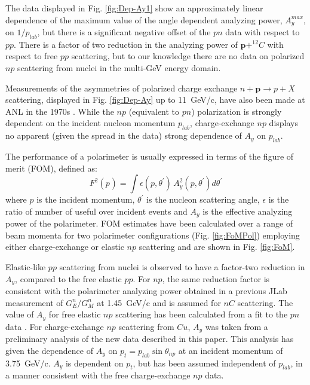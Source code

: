 \documentclass[twocolumn,epjc3]{svjour3}
\renewcommand{\vec}[1]{\boldsymbol{#1}} %
\begin{document}
The data displayed in Fig. \ref{fig:Dep-Ay1} show an approximately linear dependence of the maximum value of the angle dependent analyzing power, $A_{y}^{max}$, on $1/p_{lab}$, but there is a significant negative offset of the $pn$ data with respect to $pp$. There is a factor of two reduction in the analyzing power of $\vec{p}+^{12}\!C$ with respect to free $pp$ scattering, but to our knowledge there are no data on polarized $np$ scattering from nuclei in the multi-GeV energy domain.

Measurements of the asymmetries of polarized charge exchange $n+\vec{p}\to p+X$ scattering, displayed in Fig. \ref{fig:Dep-Ay} up to 11~GeV/c, have also been made at ANL in the 1970s \cite{Robrish:1970jw,PhysRevLett.30.1183}.  While the $np$ (equivalent to $pn$) polarization is strongly dependent on the incident nucleon momentum $p_{lab}$, charge-exchange $np$ displays no apparent (given the spread in the data) strong dependence of $A_{y}$ on $p_{lab}$.

The performance of a polarimeter is usually expressed in terms of the figure of merit (FOM), defined as:
\begin{equation}
  F^{2}(p_{})=\int\epsilon(p,\theta^{'})\,A_{y}^{2}(p,\theta^{'})d\theta^{'}
  \label{eq:FOM}
\end{equation}
where $p$ is the incident momentum, $\theta^{'}$ is the nucleon scattering angle, $\epsilon$ is the ratio of number of useful over incident events and $A_y$ is the effective analyzing power of the polarimeter. FOM estimates have been calculated over a range of beam momenta for two polarimeter configurations (Fig. \ref{fig:FoMPol}) employing either charge-exchange or elastic $np$ scattering and are shown in Fig. \ref{fig:FoM}.

Elastic-like $pp$ scattering from nuclei is observed to have a factor-two reduction in $A_{y}$, compared to the free elastic $pp$. For $np$, the same reduction factor is consistent with the polarimeter analyzing power obtained in a previous JLab measurement of $ G_{E}^{n}/G_{M}^{n} $ \cite{Plaster:2005cx,Madey:2003av} at 1.45~GeV/c and is assumed for $nC$ scattering.  The value of $A_{y}$ for free elastic $np$ scattering has been calculated from a fit to the $pn$ data \cite{Ladygin:409018}. For charge-exchange $np$ scattering from $Cu$, $A_{y}$ was taken from a preliminary analysis of the new data described in this paper. This analysis has given the dependence of $A_{y}$ on $p_{t}=p_{lab}\sin\theta_{np}$ at an incident momentum of 3.75~GeV/c.  $A_{y}$ is dependent on $p_{t}$, but has been assumed independent of $p_{lab}$, in a manner consistent with the free charge-exchange $np$ data.
\end{document}
